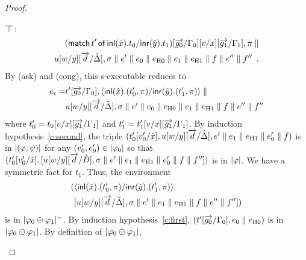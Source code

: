 \begin{proof}
\begin{description}
\begin{enumerate}[label=\textit{(\arabic{*})}]
\begin{description}
                    $\bbot$:
                    \begin{eqnarray*}
                     (\mathsf{match}\,{t'}\,\mathsf{of}\, \mathsf{inl}({\hat x}). {t_0}/ \mathsf{inr}({\hat
                      y}). {t_1})[\overrightarrow{g_0}/\Gamma_0][v/x][\overrightarrow{g_1}/\Gamma_1],\pi\parallel \\
                     u[w/y][\overrightarrow d/\hat{\Delta}],\sigma\parallel e'\parallel
                      {e_0\parallel e_{\mathrm{H0}}}\parallel {e_1\parallel e_{\mathrm{H1}}}\parallel f\parallel e''\parallel f''\enspace.
                    \end{eqnarray*}
                    By (ask) and (cong), this s-executable reduces to
                    \begin{align*}
                     e_{\mathrm r} =&
                      t'[\overrightarrow{g_0}/\Gamma_0],
                      \langle \mathsf{inl}({\hat x}). ({t_0'},{\pi})/ \mathsf{inr}({\hat y}). ({t_1'},{\pi})\rangle\parallel \\
                     &u[w/y][\overrightarrow d/\hat{\Delta}],\sigma\parallel e'\parallel
                      {e_0\parallel e_{\mathrm{H0}}}\parallel {e_1\parallel e_{\mathrm{H1}}}\parallel  f\parallel e''\parallel f''
                    \end{align*}
		    where $t_0' = t_0[v/x][\overrightarrow{g_1}/\Gamma_1]$ and $t_1' =
		    t_1'[v/x][\overrightarrow{g_1}/\Gamma_1]$.
                    By induction hypothesis~\ref{c:second},
                    the triple
                    $(t_0'[v_0'/\hat x],
                    u[w/y][\overrightarrow d/\hat {\Delta}], e'\parallel {e_1\parallel e_{\mathrm{H1}}}\parallel
                    e_0'\parallel  f)$ is in $|{(\varphi,\psi)}|$ for any
                    $(v_0',e_0')\in|{\varphi_0}|$ so
                    that
                    $(t_0'[v_0'/\hat x],
                    [u[w/y][\overrightarrow d/\hat D],\sigma\parallel e'\parallel
                    {e_1\parallel e_{\mathrm{H1}}}\parallel e_0'\parallel {f}\parallel f''])$ is in
                    $|{\varphi}|$.
                    We have a symmetric fact for $t_1$.
                    Thus, the environment
                    \begin{align*}
                    (&
                     \langle \mathsf{inl}({\hat x}). ({t_0'},{\pi})/ \mathsf{inr}({\hat y}). ({t_1'},{\pi})\rangle,\\
                     & [u[w/y][\overrightarrow{d}/\hat{\Delta}],\sigma\parallel e'\parallel {e_1\parallel e_{\mathrm{H1}}}\parallel
                      f\parallel e''\parallel f'']
                    )
                    \end{align*}
                    is in $|{\varphi_0\oplus\varphi_1}|^-$\kern -2pt.
                    By induction hypothesis~\ref{c:first},
                    $(t'[\overrightarrow{g_0}/\Gamma_0],{e_0\parallel e_{\mathrm{H0}}})$ is in
                    $|{\varphi_0\oplus\varphi_1}|$.
                    By definition of $|{\varphi_0\oplus\varphi_1}|$,

\end{description}
\end{enumerate}
\end{description}
\end{proof}
